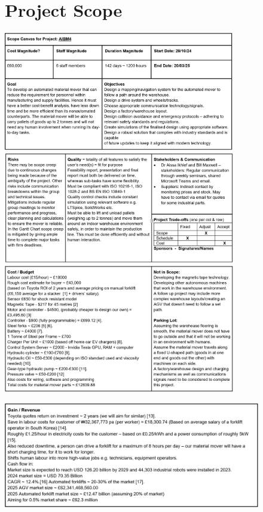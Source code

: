 \documentclass[12pt]{article}
\begin{document}
\begin{figure}[htbp]
\section{Project Scope}
    \centering
     \includegraphics[width=0.9\textwidth]{Scope Canvas 1.png}
     \includegraphics[width=0.9\textwidth]{Scope Canvas 2.png}
     \includegraphics[width=0.9\textwidth]{Scope Canvas 3.png}
   

\end{figure}
\clearpage
\begin{figure}[htbp]

    \centering
     \includegraphics[width=1\textwidth]{Scope Canvas 4.png}
\end{figure}
\FloatBarrier
\end{document}
